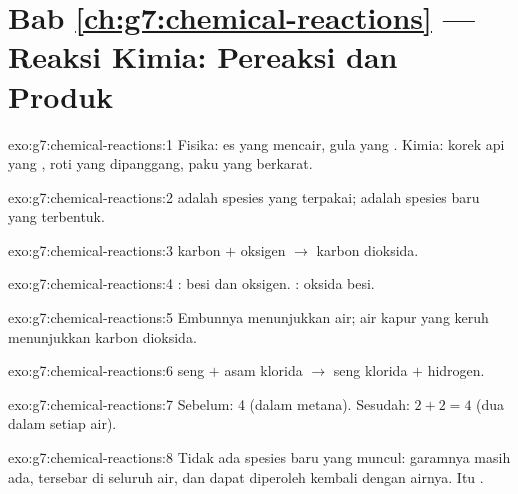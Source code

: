 \section*{Bab \ref{ch:g7:chemical-reactions} --- Reaksi Kimia: Pereaksi dan Produk}

\begin{solution}{exo:g7:chemical-reactions:1}
Fisika: es yang mencair, gula yang . Kimia: korek api yang
, roti yang dipanggang, paku yang berkarat.
\end{solution}

\begin{solution}{exo:g7:chemical-reactions:2}
 adalah spesies yang terpakai;  adalah spesies baru yang
terbentuk.
\end{solution}

\begin{solution}{exo:g7:chemical-reactions:3}
karbon $+$ oksigen $\longrightarrow$ karbon dioksida.
\end{solution}

\begin{solution}{exo:g7:chemical-reactions:4}
: besi dan oksigen. : oksida besi.
\end{solution}

\begin{solution}{exo:g7:chemical-reactions:5}
Embunnya menunjukkan air; air kapur yang keruh menunjukkan karbon
dioksida.
\end{solution}

\begin{solution}{exo:g7:chemical-reactions:6}
seng $+$ asam klorida $\longrightarrow$ seng klorida $+$ hidrogen.
\end{solution}

\begin{solution}{exo:g7:chemical-reactions:7}
Sebelum: 4 (dalam  metana). Sesudah: $2 + 2 = 4$ (dua dalam
setiap  air).
\end{solution}

\begin{solution}{exo:g7:chemical-reactions:8}
Tidak ada spesies baru yang muncul: garamnya masih ada, tersebar di
seluruh air, dan dapat diperoleh kembali dengan  airnya. Itu
.
\end{solution}

